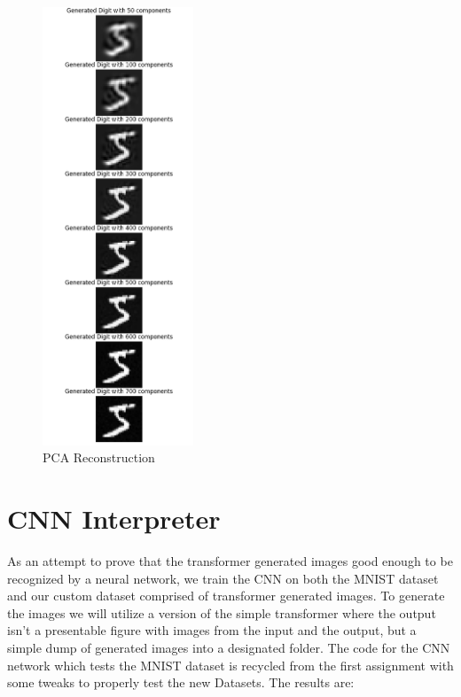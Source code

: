 \documentclass[lettersize,journal]{IEEEtran}
\begin{document}
\begin{figure}[H]   
    \centering
    \includegraphics[width=0.4\textwidth]{media/PCA_components.png}
    \caption{PCA Reconstruction}
\end{figure}


\section{CNN Interpreter}
As an attempt to prove that the transformer generated images good enough to be recognized by a 
neural network, we train the CNN on both the MNIST dataset and our custom dataset comprised of
transformer generated images. To generate the images we will utilize a version of the simple
transformer where the output isn't a presentable figure with images from the input and the output,
but a simple dump of generated images into a designated folder. The code for the CNN network which
tests the MNIST dataset is recycled from the first assignment with some tweaks to properly test the 
new Datasets. The results are:
\end{document}
